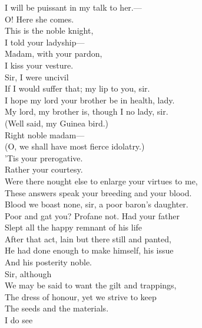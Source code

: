 \documentclass[a4paper,oneside,12pt]{memoir}
\begin{document}
\begin{drama*}
I will be puissant in my talk to her.---\\
O! Here she comes.\\
\facespeaks {} This is the noble knight,\\
I told your ladyship---\\
\mammonspeaks {} Madam, with your pardon,\\
I kiss your vesture.\\
\dolspeaks {} Sir, I were uncivil\\
If I would suffer that; my lip to you, sir.\\
\mammonspeaks I hope my lord your brother be in health, lady.\\
\dolspeaks My lord, my brother is, though I no lady, sir.\\
\facespeaks (Well said, my Guinea bird.)\\
\mammonspeaks {} Right noble madam---\\
\facespeaks (O, we shall have most fierce idolatry.)\\
\mammonspeaks 'Tis your prerogative.\\
\dolspeaks {} Rather your courtesy.\\
\mammonspeaks Were there nought else to enlarge your virtues to me,\\
These answers speak your breeding and your blood.\\
\dolspeaks Blood we boast none, sir, a poor baron's daughter.\\
\mammonspeaks Poor and gat you? Profane not. Had your father\\
Slept all the happy remnant of his life\\
After that act, lain but there still and panted,\\
He had done enough to make himself, his issue\\
And his posterity noble.\\
\dolspeaks {} Sir, although\\
We may be said to want the gilt and trappings,\\
The dress of honour, yet we strive to keep\\
The seeds and the materials.\\
\mammonspeaks {} I do see\\

\end{drama*}
\end{document}
